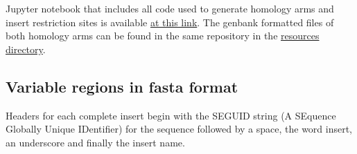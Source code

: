 \documentclass[11pt]{article}
\begin{document}
Jupyter notebook that includes all code used to generate homology arms and insert
restriction sites is available  \href{https://github.com/EthanHolleman/plasmid-VR-design/blob/main/notes/homology_arms.ipynb}{at this link}. The genbank formatted files of both homology arms can be found in the same repository in the \href{https://github.com/EthanHolleman/plasmid-VR-design/tree/main/resources/files/genbank}{resources directory}.

\subsection{Variable regions in fasta format}
\label{sec:fasta-inserts}

Headers for each complete insert begin with the SEGUID string (A SEquence Globally Unique IDentifier) \cite{Babnigg2006} for the sequence followed by a space, the word insert, an underscore and finally the insert name.
\end{document}

